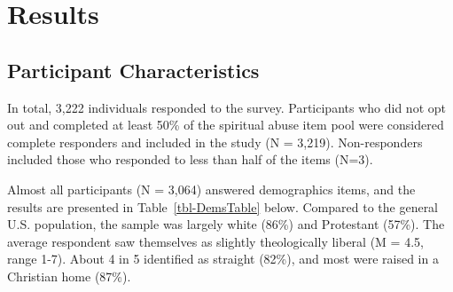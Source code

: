 \documentclass[
  letterpaper,
]{article}
\begin{document}

\hypertarget{results}{%
\chapter*{Results}\label{results}}

\hypertarget{participant-characteristics}{%
\section*{Participant
Characteristics}\label{participant-characteristics}}

In total, 3,222 individuals responded to the survey. Participants who
did not opt out and completed at least 50\% of the spiritual abuse item
pool were considered complete responders and included in the study (N =
3,219). Non-responders included those who responded to less than half of
the items (N=3).

Almost all participants (N = 3,064) answered demographics items, and the
results are presented in Table~\ref{tbl-DemsTable} below. Compared to
the general U.S. population, the sample was largely white (86\%) and
Protestant (57\%). The average respondent saw themselves as slightly
theologically liberal (M = 4.5, range 1-7). About 4 in 5 identified as
straight (82\%), and most were raised in a Christian home (87\%).
\end{document}
